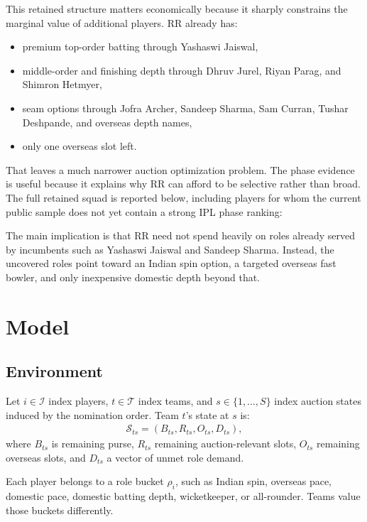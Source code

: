 \documentclass[11pt]{article}
\begin{document}
This retained structure matters economically because it sharply constrains the marginal value of additional players. RR already has:
\begin{itemize}[leftmargin=1.5em]
    \item premium top-order batting through Yashaswi Jaiswal,
    \item middle-order and finishing depth through Dhruv Jurel, Riyan Parag, and Shimron Hetmyer,
    \item seam options through Jofra Archer, Sandeep Sharma, Sam Curran, Tushar Deshpande, and overseas depth names,
    \item only one overseas slot left.
\end{itemize}

That leaves a much narrower auction optimization problem. The phase evidence is useful because it explains why RR can afford to be selective rather than broad. The full retained squad is reported below, including players for whom the current public sample does not yet contain a strong IPL phase ranking:



The main implication is that RR need not spend heavily on roles already served by incumbents such as Yashaswi Jaiswal and Sandeep Sharma. Instead, the uncovered roles point toward an Indian spin option, a targeted overseas fast bowler, and only inexpensive domestic depth beyond that.

\section{Model}

\subsection{Environment}

Let \(i\in\mathcal{I}\) index players, \(t\in\mathcal{T}\) index teams, and \(s\in\{1,\dots,S\}\) index auction states induced by the nomination order. Team \(t\)'s state at \(s\) is:
\begin{align}
\mathcal{S}_{ts} = (B_{ts}, R_{ts}, O_{ts}, D_{ts}),
\end{align}
where \(B_{ts}\) is remaining purse, \(R_{ts}\) remaining auction-relevant slots, \(O_{ts}\) remaining overseas slots, and \(D_{ts}\) a vector of unmet role demand.

Each player belongs to a role bucket \(\rho_i\), such as Indian spin, overseas pace, domestic pace, domestic batting depth, wicketkeeper, or all-rounder. Teams value those buckets differently.
\end{document}

